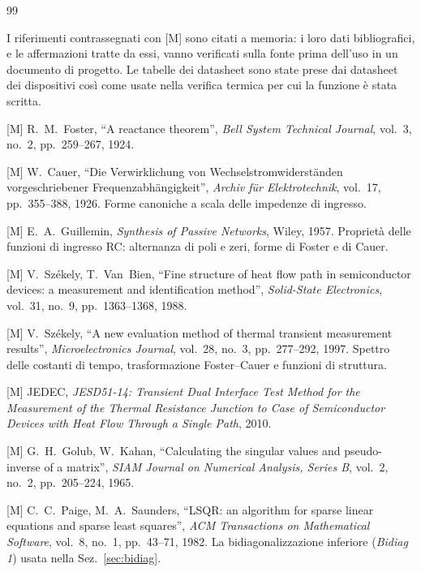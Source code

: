 \documentclass[10pt,a4paper]{scrartcl}
\begin{document}
\begin{thebibliography}{99}
\small
\item[] I riferimenti contrassegnati con [M] sono citati a memoria: i loro dati bibliografici, e le affermazioni tratte da essi, vanno verificati sulla fonte prima dell'uso in un documento di progetto. Le tabelle dei datasheet sono state prese dai datasheet dei dispositivi così come usate nella verifica termica per cui la funzione è stata scritta.

[M] R.~M.~Foster, ``A reactance theorem'', \emph{Bell System Technical Journal}, vol.~3, no.~2, pp.~259--267, 1924.

[M] W.~Cauer, ``Die Verwirklichung von Wechselstromwiderst\"anden vorgeschriebener Frequenzabh\"angigkeit'', \emph{Archiv f\"ur Elektrotechnik}, vol.~17, pp.~355--388, 1926. Forme canoniche a scala delle impedenze di ingresso.

[M] E.~A.~Guillemin, \emph{Synthesis of Passive Networks}, Wiley, 1957. Proprietà delle funzioni di ingresso RC: alternanza di poli e zeri, forme di Foster e di Cauer.

[M] V.~Sz\'ekely, T.~Van~Bien, ``Fine structure of heat flow path in semiconductor devices: a measurement and identification method'', \emph{Solid-State Electronics}, vol.~31, no.~9, pp.~1363--1368, 1988.

[M] V.~Sz\'ekely, ``A new evaluation method of thermal transient measurement results'', \emph{Microelectronics Journal}, vol.~28, no.~3, pp.~277--292, 1997. Spettro delle costanti di tempo, trasformazione Foster--Cauer e funzioni di struttura.

[M] JEDEC, \emph{JESD51-14: Transient Dual Interface Test Method for the Measurement of the Thermal Resistance Junction to Case of Semiconductor Devices with Heat Flow Through a Single Path}, 2010.

[M] G.~H.~Golub, W.~Kahan, ``Calculating the singular values and pseudo-inverse of a matrix'', \emph{SIAM Journal on Numerical Analysis, Series B}, vol.~2, no.~2, pp.~205--224, 1965.

[M] C.~C.~Paige, M.~A.~Saunders, ``LSQR: an algorithm for sparse linear equations and sparse least squares'', \emph{ACM Transactions on Mathematical Software}, vol.~8, no.~1, pp.~43--71, 1982. La bidiagonalizzazione inferiore (\emph{Bidiag 1}) usata nella Sez.~\ref{sec:bidiag}.


\end{thebibliography}
\end{document}
